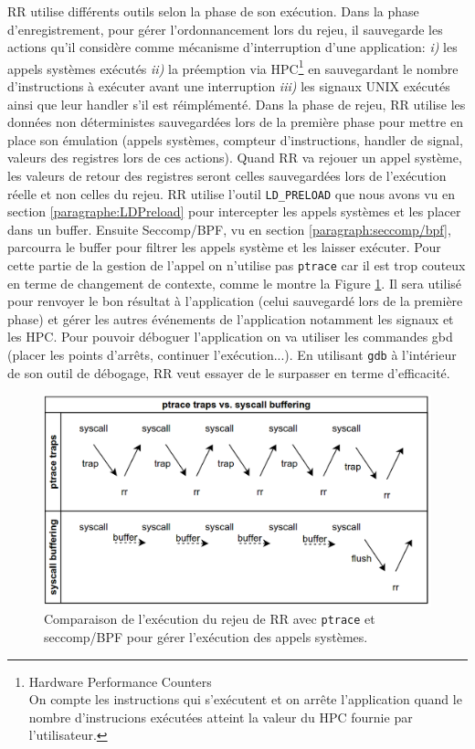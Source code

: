 RR utilise différents outils selon la phase de son
exécution\citep{RRimplem}. Dans la phase d'enregistrement, pour gérer
l'ordonnancement lors du rejeu, il sauvegarde les actions qu'il considère comme
mécanisme d'interruption d'une application: \textit{i)} les appels systèmes
exécutés \textit{ii)} la préemption via HPC\footnote{Hardware Performance
  Counters \\ On compte les instructions qui s'exécutent et on arrête
  l'application quand le nombre d'instrucions exécutées atteint la valeur du HPC
  fournie par l'utilisateur.} en sauvegardant le nombre d'instructions à
exécuter avant une interruption \textit{iii)} les signaux UNIX exécutés ainsi
que leur handler s'il est réimplémenté. Dans la phase de rejeu, RR utilise les
données non déterministes sauvegardées lors de la première phase pour mettre en
place son émulation (appels systèmes, compteur d'instructions, handler de
signal, valeurs des registres lors de ces actions). Quand RR va rejouer un appel
système, les valeurs de retour des registres seront celles sauvegardées lors de
l'exécution réelle et non celles du rejeu. RR utilise l'outil
\texttt{LD\_PRELOAD} que nous avons vu en section \ref{paragraphe:LDPreload}
pour intercepter les appels systèmes et les placer dans un buffer. Ensuite
Seccomp/BPF, vu en section \ref{paragraph:seccomp/bpf}, parcourra le buffer pour
filtrer les appels système et les laisser exécuter. Pour cette partie de la
gestion de l'appel on n'utilise pas \texttt{ptrace} car il est trop couteux en
terme de changement de contexte, comme le montre la Figure \ref{AS_RR}. Il sera utilisé pour renvoyer le bon résultat à l'application (celui sauvegardé
 lors de la première phase) et gérer les autres événements de l'application
 notamment les signaux et les HPC. Pour pouvoir déboguer l'application on va
 utiliser les commandes gbd (placer les points d'arrêts, continuer
 l'exécution...). En utilisant \texttt{gdb} à l'intérieur de son outil de
 débogage, RR veut essayer de le surpasser en terme d'efficacité.

\begin{figure}
\centering \includegraphics[scale=0.30]{Pictures/png/RR_AS}
\caption[Comparaison de l'exécution du rejeu de RR]{Comparaison de l'exécution du rejeu de RR avec \texttt{ptrace} et seccomp/BPF
  pour gérer l'exécution des appels systèmes.}
\label{AS_RR}
\end{figure}

